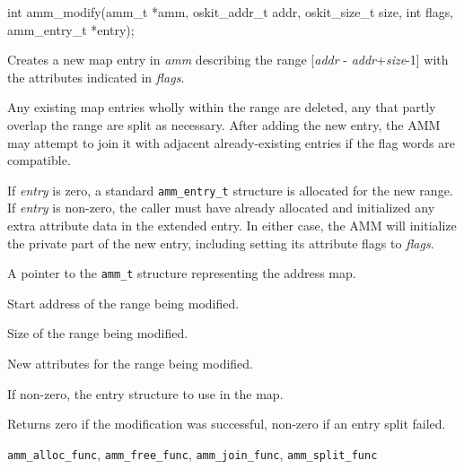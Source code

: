 \begin{apisyn}

	\funcproto int amm_modify(amm_t *amm, oskit_addr_t addr, oskit_size_t size,
			int flags, amm_entry_t *entry);
\end{apisyn}
\begin{apidesc}
	Creates a new map entry in \emph{amm} describing the range
	[\emph{addr} - \emph{addr}+\emph{size}-1]
	with the attributes indicated in \emph{flags}.

	Any existing map entries wholly within the range are deleted,
	any that partly overlap the range are split as necessary.
	After adding the new entry,
	the AMM may attempt to join it with adjacent already-existing entries
	if the flag words are compatible.

	If \emph{entry} is zero, a standard {\tt amm_entry_t} structure is
	allocated for the new range.
	If \emph{entry} is non-zero,
	the caller must have already allocated and initialized any extra
	attribute data in the extended entry.
	In either case,
	the AMM will initialize the private part of the	new entry,
	including setting its attribute flags to \emph{flags}.
\end{apidesc}
\begin{apiparm}
	\item[amm]
		A pointer to the {\tt amm_t} structure
		representing the address map.
	\item[addr]
		Start address of the range being modified.
	\item[size]
		Size of the range being modified.
	\item[flags]
		New attributes for the range being modified.
	\item[entry]
		If non-zero, the entry structure to use in the map.
\end{apiparm}
\begin{apiret}
	Returns zero if the modification was successful,
	non-zero if an entry split failed.
\end{apiret}
\begin{apirel}
	{\tt amm_alloc_func}, {\tt amm_free_func},
	{\tt amm_join_func}, {\tt amm_split_func}
\end{apirel}


